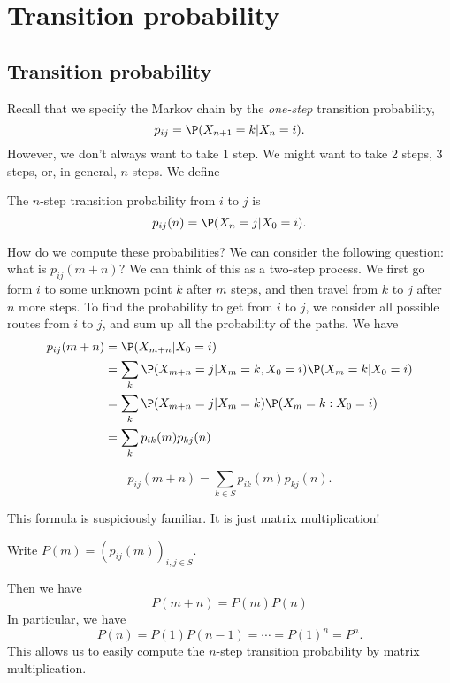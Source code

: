\documentclass[a4paper]{article}
\begin{document}
\section{Transition probability}
\subsection{Transition probability}
Recall that we specify the Markov chain by the \emph{one-step} transition probability,
\[
  p_{ij} = \P(X_{n + 1} = k| X_n = i).
\]
However, we don't always want to take 1 step. We might want to take 2 steps, 3 steps, or, in general, $n$ steps. We define
\begin{defi}
  The $n$-step transition probability from $i$ to $j$ is
  \[
    p_{ij}(n) = \P(X_n = j| X_0 = i).
  \]
\end{defi}
How do we compute these probabilities? We can consider the following question: what is $p_{ij}(m + n)$? We can think of this as a two-step process. We first go form $i$ to some unknown point $k$ after $m$ steps, and then travel from $k$ to $j$ after $n$ more steps. To find the probability to get from $i$ to $j$, we consider all possible routes from $i$ to $j$, and sum up all the probability of the paths. We have
\begin{align*}
  p_{ij}(m + n) &= \P(X_{m + n}| X_0 = i)\\
  &= \sum_k \P(X_{m + n} = j| X_m = k, X_0 = i)\P(X_m = k| X_0 = i)\\
  &= \sum_k \P(X_{m + n} = j| X_m = k)\P(X_m = k: X_0 = i)\\
  &= \sum_k p_{ik}(m)p_{kj}(n)
\end{align*}
\begin{thm}
  \[
    p_{ij}(m + n) = \sum_{k\in S} p_{ik}(m) p_{kj}(n).
  \]
\end{thm}
This formula is suspiciously familiar. It is just matrix multiplication!

\begin{notation}
  Write $P(m) = (p_{ij}(m))_{i, j\in S}$.
\end{notation}
Then we have
\[
  P(m + n) = P(m)P(n)
\]
In particular, we have
\[
  P(n) = P(1)P(n - 1) = \cdots = P(1)^n = P^n.
\]
This allows us to easily compute the $n$-step transition probability by matrix multiplication.
\end{document}
